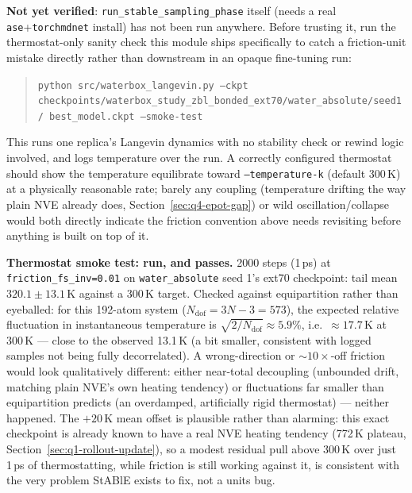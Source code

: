 \documentclass[11pt]{article}
\begin{document}
\textbf{Not yet verified}: \texttt{run\_stable\_sampling\_phase} itself
(needs a real \texttt{ase}+\texttt{torchmdnet} install) has not been run
anywhere. Before trusting it, run the thermostat-only sanity check this
module ships specifically to catch a friction-unit mistake directly rather
than downstream in an opaque fine-tuning run:
\begin{quote}
\texttt{python src/waterbox\_langevin.py --ckpt
checkpoints/waterbox\_study\_zbl\_bonded\_ext70/water\_absolute/seed1/
best\_model.ckpt --smoke-test}
\end{quote}
This runs one replica's Langevin dynamics with no stability check or
rewind logic involved, and logs temperature over the run. A correctly
configured thermostat should show the temperature equilibrate toward
\texttt{--temperature-k} (default 300\,K) at a physically reasonable rate;
barely any coupling (temperature drifting the way plain NVE already does,
Section~\ref{sec:q4-epot-gap}) or wild oscillation/collapse would both
directly indicate the friction convention above needs revisiting before
anything is built on top of it.

\textbf{Thermostat smoke test: run, and passes.} 2000 steps (1\,ps) at
\texttt{friction\_fs\_inv=0.01} on \texttt{water\_absolute} seed 1's ext70
checkpoint: tail mean $320.1\pm13.1$\,K against a 300\,K target. Checked
against equipartition rather than eyeballed: for this 192-atom system
($N_{\text{dof}}=3N{-}3=573$), the expected relative fluctuation in
instantaneous temperature is $\sqrt{2/N_{\text{dof}}}\approx5.9\%$, i.e.\
$\approx17.7$\,K at 300\,K --- close to the observed 13.1\,K (a bit smaller,
consistent with logged samples not being fully decorrelated). A
wrong-direction or $\sim\!10\times$-off friction would look qualitatively
different: either near-total decoupling (unbounded drift, matching plain
NVE's own heating tendency) or fluctuations far smaller than equipartition
predicts (an overdamped, artificially rigid thermostat) --- neither
happened. The $+20$\,K mean offset is plausible rather than alarming: this
exact checkpoint is already known to have a real NVE heating tendency
(772\,K plateau, Section~\ref{sec:q1-rollout-update}), so a modest residual
pull above 300\,K over just 1\,ps of thermostatting, while friction is
still working against it, is consistent with the very problem StABlE
exists to fix, not a units bug.
\end{document}
